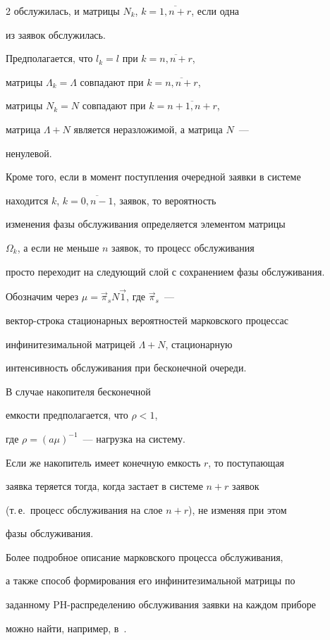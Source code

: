 \begin{multicols}{2}
обслужилась, и матрицы $N_k$, $k=\overline{1,n+r}$, если одна


из заявок обслужилась.


Предполагается, что $l_k=l$ при $k=\overline{n,n+r}$,


матрицы $\Lambda_k = \Lambda$ совпадают при $k=\overline{n,n+r}$,


матрицы $N_k = N$ совпадают при $k=\overline{n+1,n+r}$,


матрица $\Lambda+N$ является неразложимой, а матрица $N$~---


ненулевой.


Кроме того, если в момент поступления очередной заявки в системе


находится $k$, $k=\overline{0,n-1}$, заявок, то вероятность


изменения фазы обслуживания определяется элементом матрицы


$\Omega_k$, а если не меньше $n$ заявок, то процесс обслуживания


прос\-то переходит на следующий слой с сохранением фазы обслуживания.


Обозначим через $\mu = \vec \pi_s N \vec1$, где $\vec\pi_s$~---


вектор-строка стационарных вероятностей марковского процесса\linebreak с


инфинитезимальной матрицей $\Lambda+N$, стацио\-нарную


интенсивность обслуживания при бесконечной очереди.


В случае накопителя бесконечной %


емкости предполагается, что $\rho<1$,


где $\rho = (a \mu)^{-1}$~--- нагрузка на систему.


Если же накопитель имеет конечную емкость $r$, то поступающая


заявка теряется тогда, когда застает в системе $n+r$ заявок


(т.\,е.\ процесс обслуживания на слое $n+r$), не изменяя при этом


фазы обслуживания.


Более подробное описание марковского процесса обслуживания,


а также способ формирования его инфинитезимальной матрицы по


заданному PH-распределению обслуживания заявки на каждом приборе


можно найти, например, в~\cite{PC04,PC03}.






\end{multicols}
